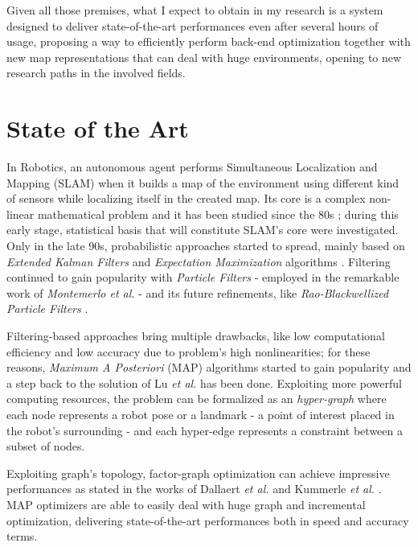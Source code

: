 \documentclass[10pt,a4paper, notitlepage]{report}
\begin{document}
\vspace{15px}

Given all those premises, what I expect to obtain in my research is a system designed to deliver state-of-the-art performances even after several hours of usage, proposing a way to efficiently perform back-end optimization together with new map representations that can deal with huge environments, opening to new research paths in the involved fields.


\section*{State of the Art}
In Robotics, an autonomous agent performs Simultaneous Localization and Mapping (SLAM) when it builds a map of the environment using different kind of sensors while localizing itself in the created map. Its core is a complex non-linear mathematical problem and it has been studied since the 80s \cite{durrant2006simultaneous} \cite{bailey2006simultaneous}; during this early stage, statistical basis that will constitute SLAM's core were investigated. Only in the late 90s, probabilistic approaches started to spread, mainly based on \textit{Extended Kalman Filters} \cite{leonard1990dynamic} \cite{dissanayake2001solution} and \textit{Expectation Maximization} algorithms \cite{dellaert2003mcmc} \cite{thrun2001probabilistic}. Filtering continued to gain popularity with \textit{Particle Filters} - employed in the remarkable work of \textit{Montemerlo et al.} \cite{montemerlo2002fastslam} - and its future refinements, like \textit{Rao-Blackwellized Particle Filters} \cite{grisetti2005improving} \cite{carlone2010rao} \cite{tipaldi2007heterogeneous}.

Filtering-based approaches bring multiple drawbacks, like low computational efficiency and low accuracy due to problem's high nonlinearities; for these reasons, \textit{Maximum A Posteriori} (MAP) algorithms started to gain popularity and a step back to the solution of Lu \textit{et al.} \cite{lu1997globally} has been done. Exploiting more powerful computing resources, the problem can be formalized as an \textit{hyper-graph} where each node represents a robot pose or a landmark - a point of interest placed in the robot's surrounding - and each hyper-edge represents a constraint between a subset of nodes. 

Exploiting graph's topology, factor-graph optimization can achieve impressive performances as stated in the works of Dallaert \textit{et al.} \cite{dellaert2006square} and Kummerle \textit{et al.}  \cite{kummerle2011g}. MAP optimizers \cite{kummerle2011g} \cite{dellaert2012gtsam} \cite{ceres-solver} \cite{kaess2012isam2} are able to easily deal with huge graph and incremental optimization, delivering state-of-the-art performances both in speed and accuracy terms.
\end{document}
